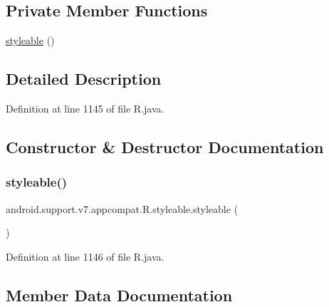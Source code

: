 \subsection*{Private Member Functions}
\begin{DoxyCompactItemize}
\item 
\mbox{\hyperlink{classandroid_1_1support_1_1v7_1_1appcompat_1_1_r_1_1styleable_a073eb38838bc7119b3e0a4c46f1263f6}{styleable}} ()
\end{DoxyCompactItemize}


\subsection{Detailed Description}


Definition at line 1145 of file R.\+java.



\subsection{Constructor \& Destructor Documentation}
\mbox{\label{classandroid_1_1support_1_1v7_1_1appcompat_1_1_r_1_1styleable_a073eb38838bc7119b3e0a4c46f1263f6}} 
\subsubsection{\texorpdfstring{styleable()}{styleable()}}
{\footnotesize\ttfamily android.\+support.\+v7.\+appcompat.\+R.\+styleable.\+styleable (\begin{DoxyParamCaption}{ }\end{DoxyParamCaption})\hspace{0.3cm}{\ttfamily [private]}}



Definition at line 1146 of file R.\+java.


\begin{DoxyCode}{0}

\end{DoxyCode}


\subsection{Member Data Documentation}
\mbox{\label{classandroid_1_1support_1_1v7_1_1appcompat_1_1_r_1_1styleable_a5941dc15714398e9ec9afaa0155cc1cf}} 
